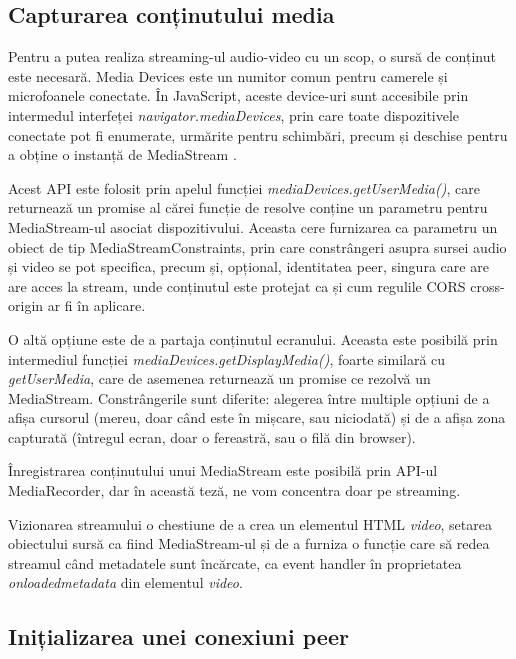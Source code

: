 \subsection{Capturarea conținutului media}
\label{sec:ch2sec4subsec1}
\indent \par Pentru a putea realiza streaming-ul audio-video cu un scop, o sursă de conținut este necesară. Media Devices este un numitor comun pentru camerele și microfoanele conectate. În JavaScript, aceste device-uri sunt accesibile prin intermedul interfeței \textit{navigator.mediaDevices}, prin care toate dispozitivele conectate pot fi enumerate, urmărite pentru schimbări, precum și deschise pentru a obține o instanță de MediaStream \cite{WebMedia2014}.
\indent \par Acest API este folosit prin apelul funcției \textit{mediaDevices.getUserMedia()}, care returnează un promise al cărei funcție de resolve conține un parametru pentru MediaStream-ul asociat dispozitivului. Aceasta cere furnizarea ca parametru un obiect de tip MediaStreamConstraints, prin care constrângeri asupra sursei audio și video se pot specifica, precum și, opțional, identitatea peer, singura care are are acces la stream, unde conținutul este protejat ca și cum regulile CORS cross-origin ar fi în aplicare.
\indent \par O altă opțiune este de a partaja conținutul ecranului. Aceasta este posibilă prin intermediul funcției \textit{mediaDevices.getDisplayMedia()}, foarte similară cu \textit{getUserMedia}, care de asemenea returnează un promise ce rezolvă un MediaStream. Constrângerile sunt diferite: alegerea între multiple opțiuni de a afișa cursorul (mereu, doar când este în mișcare, sau niciodată) și de a afișa zona capturată (întregul ecran, doar o fereastră, sau o filă din browser).
\indent \par Înregistrarea conținutului unui MediaStream este posibilă prin API-ul MediaRecorder, dar în această teză, ne vom concentra doar pe streaming.
\indent \par Vizionarea streamului o chestiune de a crea un elementul HTML \textit{video}, setarea obiectului sursă ca fiind MediaStream-ul și de a furniza o funcție care să redea streamul când metadatele sunt încărcate, ca event handler în proprietatea \textit{onloadedmetadata} din elementul \textit{video}.

\subsection{Inițializarea unei conexiuni peer}
\label{sec:ch3sec4subsec2}

